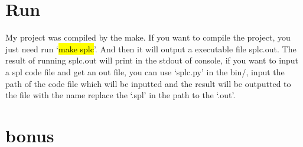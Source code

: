 \documentclass{article}
\begin{document}
    \section{Run}
        My project was compiled by the make. If you want to compile the project, you just need run `\hl{make splc}'. And then it will output a executable file splc.out. 
        The result of running splc.out will print in the stdout of console, if you want to input a spl code file and get an out file, you can use `splc.py' in the bin/, input
        the path of the code file which will be inputted and the result will be outputted to the file with the name replace the `.spl' in the path to the `.out'.
    \section{bonus}
\end{document}
